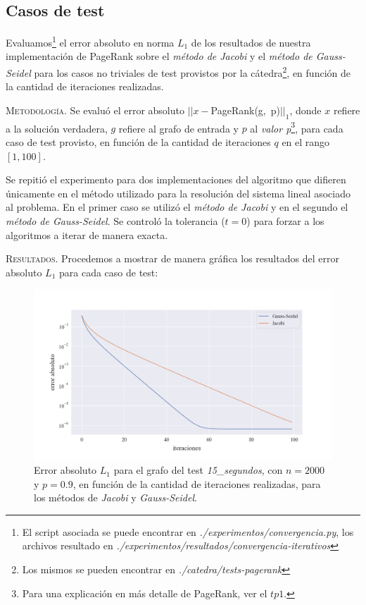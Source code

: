 \subsection{Casos de test}

Evaluamos\footnote{El script asociada se puede encontrar en \textit{./experimentos/convergencia.py}, los archivos resultado en \textit{./experimentos/resultados/convergencia-iterativos}} el error absoluto en norma $L_1$ de los resultados de nuestra implementación de PageRank sobre el \textit{método de Jacobi} y el \textit{método de Gauss-Seidel} para los casos no triviales de test provistos por la cátedra\footnote{Los mismos se pueden encontrar en \textit{./catedra/tests-pagerank}}, en función de la cantidad de iteraciones realizadas.

\vspace{2em}
\noindent\textsc{Metodología}. Se evaluó el error absoluto $||x - $PageRank(g,\ p)$||_1$, donde $x$ refiere a la solución verdadera, $g$ refiere al grafo de entrada y $p$ al \textit{valor p}\footnote{Para una explicación en más detalle de PageRank, ver el $tp1$.}, para cada caso de test provisto, en función de la cantidad de iteraciones $q$ en el rango $[1, 100]$.

Se repitió el experimento para dos implementaciones del algoritmo que difieren únicamente en el método utilizado para la resolución del sistema lineal asociado al problema. En el primer caso se utilizó el \textit{método de Jacobi} y en el segundo el \textit{método de Gauss-Seidel}. Se controló la tolerancia ($t = 0$) para forzar a los algoritmos a iterar de manera exacta. 

\vspace{2em}
\noindent\textsc{Resultados}. Procedemos a mostrar de manera gráfica los resultados del error absoluto $L_1$ para cada caso de test:

\vspace{1em}
\begin{figure}[!htbp]
    \centering
    \includegraphics[width=1\textwidth]{files/src/.media/convergencia_test_15_segundos.png}
    \caption{Error absoluto $L_1$ para el grafo del test \textit{15\_segundos}, con $n = 2000$ y $p = 0.9$, en función de la cantidad de iteraciones realizadas, para los métodos de \textit{Jacobi} y \textit{Gauss-Seidel}.} \label{test_15_segundos}
\end{figure}

